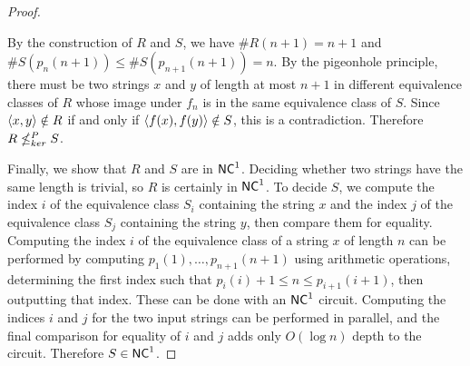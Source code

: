 \begin{proof}
\begin{center}
  \end{center}
  By the construction of $R$ and $S$, we have $\#R(n + 1) = n + 1$ and $\#S(p_n(n + 1)) \leq \#S(p_{n + 1}(n + 1)) = n$.
  By the pigeonhole principle, there must be two strings $x$ and $y$ of length at most $n + 1$ in different equivalence classes of $R$ whose image under $f_n$ is in the same equivalence class of $S$.
  Since $\langle x,y\rangle \notin R$ if and only if $\langle f(x),f(y)\rangle \notin S$, this is a contradiction.
  Therefore $R \nleq^{P}_{ker} S$.

  Finally, we show that $R$ and $S$ are in ${\mathsf{NC}}^1$.
  Deciding whether two strings have the same length is trivial, so $R$ is certainly in ${\mathsf{NC}}^1$.
  To decide $S$, we compute the index $i$ of the equivalence class $S_i$ containing the string $x$ and the index $j$ of the equivalence class $S_j$ containing the string $y$, then compare them for equality.
  Computing the index $i$ of the equivalence class of a string $x$ of length $n$ can be performed by computing $p_1(1), \dotsc, p_{n + 1}(n + 1)$ using arithmetic operations, determining the first index such that $p_i(i) + 1 \leq n \leq p_{i + 1}(i + 1)$, then outputting that index.
  These can be done with an ${\mathsf{NC}}^1$ circuit.
  Computing the indices $i$ and $j$ for the two input strings can be performed in parallel, and the final comparison for equality of $i$ and $j$ adds only $O(\log n)$ depth to the circuit.
  Therefore $S \in {\ensuremath{\mathsf{NC}}}^1$.
\end{proof}
